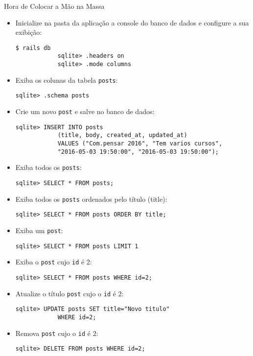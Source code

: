 \begin{frame}{Hora de Colocar a Mão na Massa}
	\begin{itemize}
		\item Inicialize \alert{na pasta da aplicação} a console do banco de dados e
		configure a sua exibição:
		\begin{lstlisting}[style=BashInputBasicStyle]
			$ rails db
			sqlite> .headers on
			sqlite> .mode columns
		\end{lstlisting}
		
		\item Exiba os colunas da tabela \verb|posts|:
		\begin{lstlisting}[style=BashInputBasicStyle]
			sqlite> .schema posts
		\end{lstlisting}
		
		\framebreak
		\item Crie um novo \verb|post| e salve no banco de dados:
		\begin{lstlisting}[style=BashInputBasicStyle]
			sqlite> INSERT INTO posts 
			(title, body, created_at, updated_at) 
			VALUES ("Com.pensar 2016", "Tem varios cursos", 
			"2016-05-03 19:50:00", "2016-05-03 19:50:00");
		\end{lstlisting}
		
		\item Exiba todos os \verb|posts|:
		\begin{lstlisting}[style=BashInputBasicStyle]
			sqlite> SELECT * FROM posts;
		\end{lstlisting}
		
		\item Exiba todos os \verb|posts| ordenados pelo título (title):
		\begin{lstlisting}[style=BashInputBasicStyle]
			sqlite> SELECT * FROM posts ORDER BY title;
		\end{lstlisting}
		
		\item Exiba um \verb|post|:
		\begin{lstlisting}[style=BashInputBasicStyle]
			sqlite> SELECT * FROM posts LIMIT 1
		\end{lstlisting}
		
		\item Exiba o \verb|post| cujo \verb|id| é 2:
		\begin{lstlisting}[style=BashInputBasicStyle]
			sqlite> SELECT * FROM posts WHERE id=2;
		\end{lstlisting}
		
		\item Atualize o título \verb|post| cujo o \verb|id| é 2:
		\begin{lstlisting}[style=BashInputBasicStyle]
			sqlite> UPDATE posts SET title="Novo titulo" 
			WHERE id=2;
		\end{lstlisting}
		
		\item Remova \verb|post| cujo o \verb|id| é 2:
		\begin{lstlisting}[style=BashInputBasicStyle]
			sqlite> DELETE FROM posts WHERE id=2;
		\end{lstlisting}
		
	\end{itemize}
\end{frame}